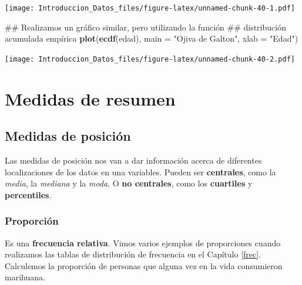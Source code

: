 \documentclass[spanish,]{book}
\newenvironment{Shaded}{\begin{snugshade}}{\end{snugshade}}
\newcommand{\KeywordTok}[1]{\textcolor[rgb]{0.13,0.29,0.53}{\textbf{#1}}}
\newcommand{\DataTypeTok}[1]{\textcolor[rgb]{0.13,0.29,0.53}{#1}}
\newcommand{\StringTok}[1]{\textcolor[rgb]{0.31,0.60,0.02}{#1}}
\newcommand{\OperatorTok}[1]{\textcolor[rgb]{0.81,0.36,0.00}{\textbf{#1}}}
\newcommand{\NormalTok}[1]{#1}
\begin{document}
\texttt{[image: Introduccion\_Datos\_files/figure-latex/unnamed-chunk-40-1.pdf]}

\begin{Shaded}
\begin{Highlighting}[]
\NormalTok{## Realizamos un gráfico similar, pero utilizando la función}
\NormalTok{## distribución acumulada empírica}
\KeywordTok{plot}\NormalTok{(}\KeywordTok{ecdf}\NormalTok{(edad),}
     \DataTypeTok{main =} \StringTok{"Ojiva de Galton"}\NormalTok{,}
     \DataTypeTok{xlab =} \StringTok{"Edad"}\NormalTok{)}
\end{Highlighting}
\end{Shaded}

\texttt{[image: Introduccion\_Datos\_files/figure-latex/unnamed-chunk-40-2.pdf]}

\chapter{Medidas de resumen}\label{medidas-de-resumen}

\section{Medidas de posición}\label{medidas-de-posicion}

Las medidas de posición nos van a dar información acerca de diferentes
localizaciones de los datos en una variables. Pueden ser
\textbf{centrales}, como la \emph{media}, la \emph{mediana} y la
\emph{moda}. O \textbf{no centrales}, como los \textbf{cuartiles} y
\textbf{percentiles}.

\subsection{Proporción}\label{proporcion}

Es una \textbf{frecuencia relativa}. Vimos varios ejemplos de
proporciones cuando realizamos las tablas de distribución de frecuencia
en el Capítulo \ref{frec}. Calculemos la proporción de personas que
alguna vez en la vida consumieron marihuana.

\begin{Shaded}
\end{Shaded}
\end{document}
